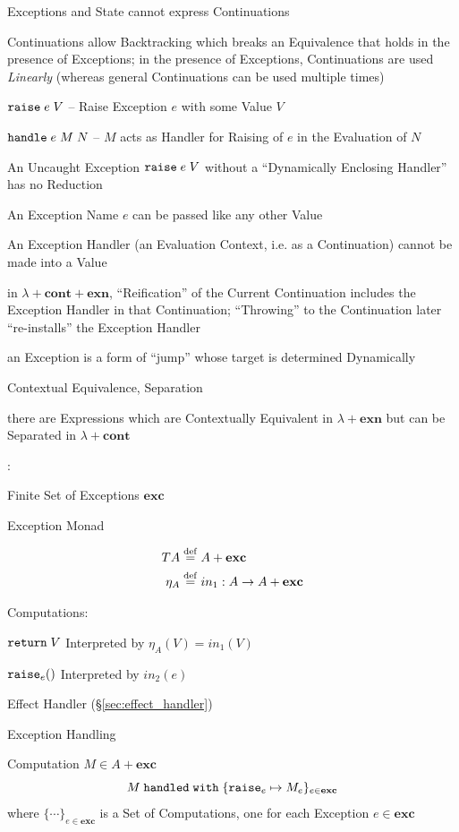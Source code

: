 Exceptions and State cannot express Continuations

Continuations allow Backtracking which breaks an Equivalence that holds in the
presence of Exceptions; in the presence of Exceptions, Continuations are used
\emph{Linearly} (whereas general Continuations can be used multiple times)

$\mathtt{raise}\;e\;V$ -- Raise Exception $e$ with some Value $V$

$\mathtt{handle}\;e\;M\;N$ -- $M$ acts as Handler for Raising of $e$ in the
Evaluation of $N$

An Uncaught Exception $\mathtt{raise}\;e\;V$ without a ``Dynamically Enclosing
Handler'' has no Reduction

An Exception Name $e$ can be passed like any other Value

An Exception Handler (an Evaluation Context, i.e. as a Continuation) cannot be
made into a Value

in $\lambda + \mathbf{cont} + \mathbf{exn}$, ``Reification'' of the Current
Continuation includes the Exception Handler in that Continuation; ``Throwing''
to the Continuation later ``re-installs'' the Exception Handler

an Exception is a form of ``jump'' whose target is determined Dynamically %

Contextual Equivalence, Separation %

there are Expressions which are Contextually Equivalent in
$\lambda + \mathbf{exn}$ but can be Separated in $\lambda + \mathbf{cont}$


\cite{plotkin-pretnar13}:

Finite Set of Exceptions $\mathbf{exc}$

Exception Monad

\begin{align*}
     T A & \stackrel{\mathrm{def}}= A + \mathbf{exc} \\
  \eta_A & \stackrel{\mathrm{def}}= in_1 : A \rightarrow A + \mathbf{exc}
\end{align*}

Computations:

$\mathtt{return}\; V$ Interpreted by $\eta_A(V) = in_1(V)$

$\mathtt{raise}_e()$ Interpreted by $in_2(e)$

Effect Handler (\S\ref{sec:effect_handler})

Exception Handling

Computation $M \in A + \mathbf{exc}$
\[
  M \;\mathtt{handled\;with}\;
    \{\mathtt{raise}_e \mapsto M_e \}_{e\in\mathbf{exc}}
\]
where $\{\cdots\}_{e\in\mathbf{exc}}$ is a Set of Computations, one for each
Exception $e \in \mathbf{exc}$

